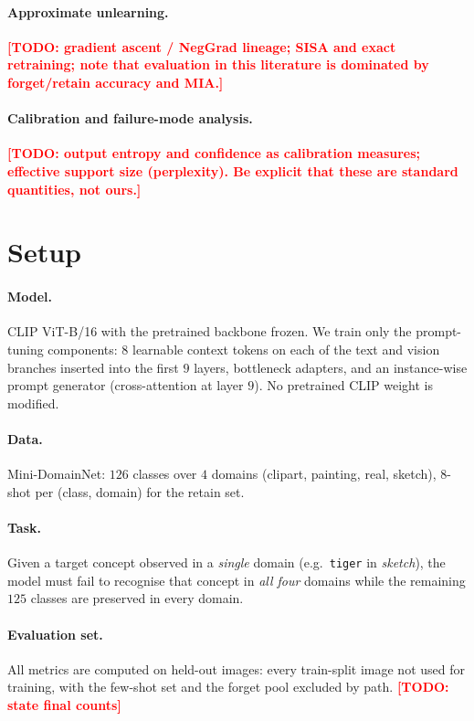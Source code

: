 \documentclass[10pt]{article}
\newcommand{\todo}[1]{\textcolor{red}{\textbf{[TODO: #1]}}}
\begin{document}
\paragraph{Approximate unlearning.}
\todo{gradient ascent / NegGrad lineage; SISA and exact retraining; note that
evaluation in this literature is dominated by forget/retain accuracy and MIA.}

\paragraph{Calibration and failure-mode analysis.}
\todo{output entropy and confidence as calibration measures; effective support
size (perplexity). Be explicit that these are standard quantities, not ours.}

\section{Setup}
\label{sec:setup}

\paragraph{Model.} CLIP ViT-B/16 with the pretrained backbone frozen. We train
only the prompt-tuning components: $8$ learnable context tokens on each of the
text and vision branches inserted into the first $9$ layers, bottleneck
adapters, and an instance-wise prompt generator (cross-attention at layer $9$).
No pretrained CLIP weight is modified.

\paragraph{Data.} Mini-DomainNet: $126$ classes over $4$ domains (clipart,
painting, real, sketch), $8$-shot per (class, domain) for the retain set.

\paragraph{Task.} Given a target concept observed in a \emph{single} domain
(e.g.\ \texttt{tiger} in \emph{sketch}), the model must fail to recognise that
concept in \emph{all four} domains while the remaining $125$ classes are
preserved in every domain.

\paragraph{Evaluation set.} All metrics are computed on held-out images: every
train-split image not used for training, with the few-shot set and the forget
pool excluded by path. \todo{state final counts}
\end{document}
